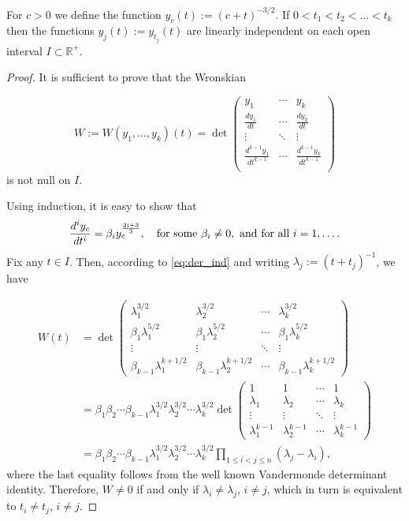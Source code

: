 \documentclass[smallcondensed]{svjour3}
\begin{document}
\begin{lemma}\label{lem:1} For $c>0$ we define the function $y_c(t):=(c+t)^{-3/2}$. If $0<t_1<t_2<\ldots<t_k$ then the functions $y_j(t):=y_{t_j}(t)$  are linearly independent on  each open interval   $I\subset \mathbb{R}^+$.
\end{lemma}
\begin{proof} It is sufficient to prove that the Wronskian

 \[W:=W(y_1,\ldots,y_k)(t)=\det\begin{pmatrix}
			      y_1 & \cdots & y_k\\
			      \frac{dy_1}{dt}&  \cdots & \frac{dy_k}{dt}\\
			      \vdots & \ddots & \vdots \\
			      \frac{d^{k-1}y_1}{dt^{k-1}}&  \cdots & \frac{d^{k-1}y_k}{dt^{k-1}}\\
                           \end{pmatrix}
\]
is not null on $I$.

Using induction, it is easy to show that
\begin{equation}\label{eq:der_ind}\frac{d^iy_c}{dt^i}=\beta_{i}y_{c}^{\frac{2i+3}{3}},\quad\hbox{for some }\beta_{i}\neq 0, \hbox{ and for all }i=1,\ldots.
\end{equation}
Fix any $t\in I$. Then, according to \eqref{eq:der_ind} and writing $\lambda_j:=(t+t_j)^{-1}$, we have

\[
\begin{split}
  W(t)&=\det
    \begin{pmatrix}
      \lambda_1^{3/2} & \lambda_2^{3/2} &\cdots & \lambda_k^{3/2} \\
      \beta_1\lambda_1^{5/2} &\beta_1 \lambda_2^{5/2} &\cdots &\beta_1 \lambda_k^{5/2}\\
      \vdots & \vdots &\ddots & \vdots\\
      \beta_{k-1}\lambda_1^{k+1/2} & \beta_{k-1}\lambda_2^{k+1/2} &\cdots & \beta_{k-1}\lambda_k^{k+1/2}
    \end{pmatrix}
  \\
  &= \beta_1\beta_2\cdots\beta_{k-1} \lambda_1^{3/2}\lambda_2^{3/2}\cdots \lambda_k^{3/2}
     \det \begin{pmatrix}
      1& 1 &\cdots & 1 \\
      \lambda_1 & \lambda_2 &\cdots & \lambda_k\\
      \vdots & \vdots &\ddots & \vdots\\
      \lambda_1^{k-1} & \lambda_2^{k-1} &\cdots & \lambda_k^{k-1}
    \end{pmatrix}
  \\
  &= \beta_1\beta_2\cdots\beta_{k-1} \lambda_1^{3/2}\lambda_2^{3/2}\cdots \lambda_k^{3/2}
  \prod_{1\leq i<j\leq n}(\lambda_j-\lambda_i)
,
\end{split}
\]
where the last equality follows from the well known Vandermonde determinant identity. Therefore, 
$W\neq 0$ if and only if $\lambda_i\neq\lambda_j$, $i\neq j$,
which in turn is equivalent to $t_i\neq t_j$, $i\neq j$.
\end{proof}
\end{document}
